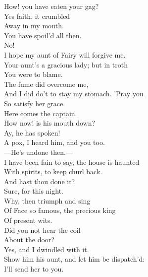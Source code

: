 \documentclass[a4paper,oneside]{memoir}
\begin{document}
\begin{drama*}
\subtlespeaks How! you have eaten your gag?\\
\dapperspeaks {} Yes faith, it crumbled\\
Away in my mouth.\\
\subtlespeaks {} You have spoil'd all then.\\
\dapperspeaks No!\\
I hope my aunt of Fairy will forgive me.\\
\subtlespeaks Your aunt's a gracious lady; but in troth\\
You were to blame.\\
\dapperspeaks {} The fume did overcome me,\\
And I did do't to stay my stomach. 'Pray you\\
So satisfy her grace.\\
Here comes the captain.\\
\facespeaks {} How now! is his mouth down?\\
\subtlespeaks Ay, he has spoken!\\
\facespeaks {} A pox, I heard him, and you too.\\
---He's undone then.---\\
I have been fain to say, the house is haunted\\
With spirits, to keep churl back.\\
\subtlespeaks {} And hast thou done it?\\
\facespeaks Sure, for this night.\\
\subtlespeaks {} Why, then triumph and sing\\
Of Face so famous, the precious king\\
Of present wits.\\
\facespeaks {} Did you not hear the coil\\
About the door?\\
\subtlespeaks {} Yes, and I dwindled with it.\\
\facespeaks Show him his aunt, and let him be dispatch'd:\\
I'll send her to you.\\

\end{drama*}
\end{document}

